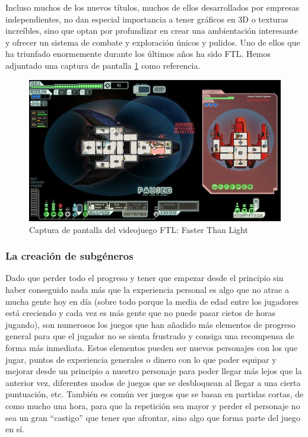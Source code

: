 Incluso muchos de los nuevos títulos, muchos de ellos desarrollados por empresas independientes, no dan especial importancia a tener gráficos en 3D o texturas increíbles, sino que optan por profundizar en crear una ambientación interesante y ofrecer un sistema de combate y exploración únicos y pulidos.
Uno de ellos que ha triunfado enormemente durante los últimos años ha sido FTL. Hemos adjuntado una captura de pantalla \ref{fig:ftl} como referencia.

\begin{figure}[h!]
		\includegraphics[width=\textwidth,height=\textheight,keepaspectratio]{./img/ftl.jpg}
	\caption{Captura de pantalla del videojuego FTL: Faster Than Light}
	\label{fig:ftl}
\end{figure}

\subsubsection{La creación de subgéneros}

Dado que perder todo el progreso y tener que empezar desde el principio sin haber conseguido nada más que la experiencia personal es algo que no atrae a mucha gente hoy en día (sobre todo porque la media de edad entre los jugadores está creciendo y cada vez es más gente que no puede pasar cietos de horas jugando), son numerosos los juegos que han añadido más elementos de progreso general para que el jugador no se sienta frustrado y consiga una recompensa de forma más inmediata. Estos elementos pueden ser nuevos personajes con los que jugar, puntos de experiencia generales o dinero con lo que poder equipar y mejorar desde un principio a nuestro personaje para poder llegar más lejos que la anterior vez, diferentes modos de juegos que se desbloquean al llegar a una cierta puntuación, etc.
También es común ver juegos que se basan en partidas cortas, de como mucho una hora, para que la repetición sea mayor y perder el personaje no sea un gran ``castigo'' que tener que afrontar, sino algo que forma parte del juego en sí.

